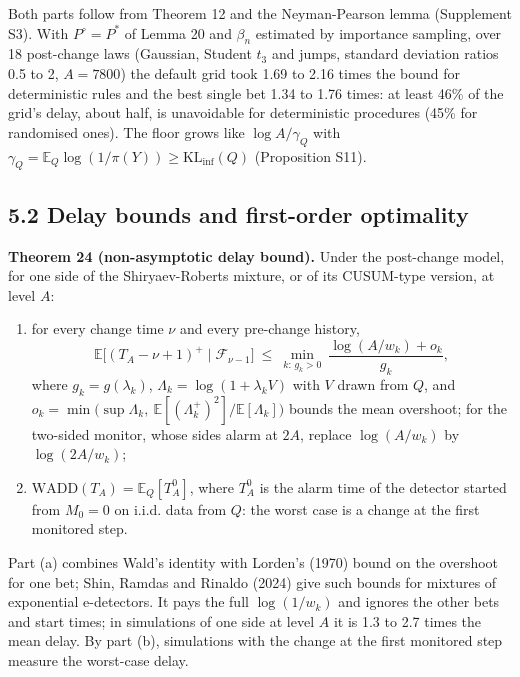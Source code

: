 \documentclass[
]{article}
\begin{document}
Both parts follow from Theorem 12 and the Neyman-Pearson lemma
(Supplement S3). With \(P^\circ = P^\ast\) of Lemma 20 and \(\beta_n\)
estimated by importance sampling, over 18 post-change laws (Gaussian,
Student \(t_3\) and jumps, standard deviation ratios 0.5 to 2,
\(A = 7800\)) the default grid took 1.69 to 2.16 times the bound for
deterministic rules and the best single bet 1.34 to 1.76 times: at least
46\% of the grid's delay, about half, is unavoidable for deterministic
procedures (45\% for randomised ones). The floor grows like
\(\log A/\gamma_Q\) with
\(\gamma_Q = \mathbb{E}_Q\log(1/\pi(Y)) \ge \mathrm{KL}_{\inf}(Q)\)
(Proposition S11).

\hypertarget{delay-bounds-and-first-order-optimality}{%
\subsection{5.2 Delay bounds and first-order
optimality}\label{delay-bounds-and-first-order-optimality}}

\textbf{Theorem 24 (non-asymptotic delay bound).} Under the post-change
model, for one side of the Shiryaev-Roberts mixture, or of its
CUSUM-type version, at level \(A\):

\begin{enumerate}
\def\labelenumi{(\alph{enumi})}
\item
  for every change time \(\nu\) and every pre-change history, \[
  \mathbb{E}\big[(T_A - \nu + 1)^+ \mid \mathcal{F}_{\nu-1}\big] \ \le\ \min_{k:\, g_k > 0}\ \frac{\log(A/w_k) + o_k}{g_k},
  \] where \(g_k = g(\lambda_k)\), \(\Lambda_k = \log(1 + \lambda_k V)\)
  with \(V\) drawn from \(Q\), and
  \(o_k = \min\big(\sup \Lambda_k,\ \mathbb{E}[(\Lambda_k^+)^2]/\mathbb{E}[\Lambda_k]\big)\)
  bounds the mean overshoot; for the two-sided monitor, whose sides
  alarm at \(2A\), replace \(\log(A/w_k)\) by \(\log(2A/w_k)\);
\item
  \(\mathrm{WADD}(T_A) = \mathbb{E}_Q[T_A^0]\), where \(T_A^0\) is the
  alarm time of the detector started from \(M_0 = 0\) on i.i.d. data
  from \(Q\): the worst case is a change at the first monitored step.
\end{enumerate}

Part (a) combines Wald's identity with Lorden's (1970) bound on the
overshoot for one bet; Shin, Ramdas and Rinaldo (2024) give such bounds
for mixtures of exponential e-detectors. It pays the full
\(\log(1/w_k)\) and ignores the other bets and start times; in
simulations of one side at level \(A\) it is 1.3 to 2.7 times the mean
delay. By part (b), simulations with the change at the first monitored
step measure the worst-case delay.
\end{document}
